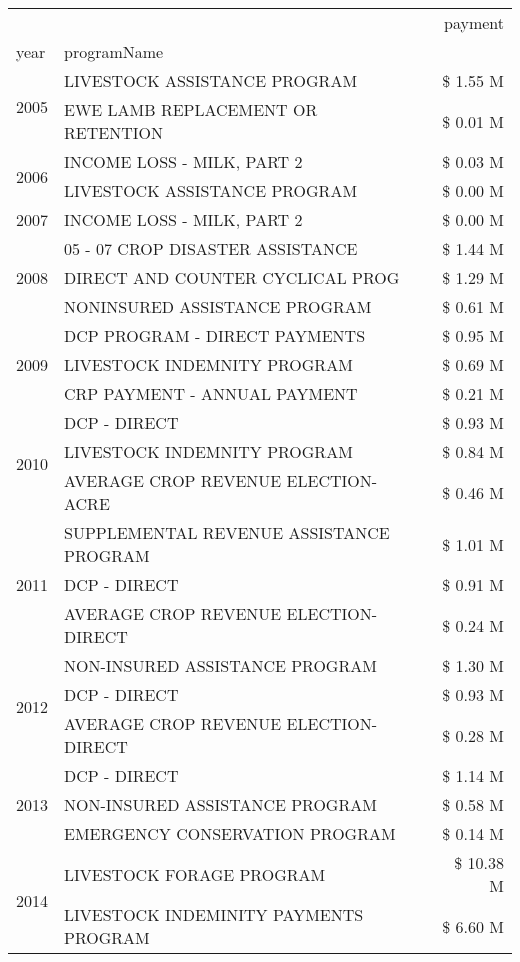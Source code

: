 \begin{tabular}{llr}
\toprule
 &  & payment \\
year & programName &  \\
\midrule
\multirow[t]{2}{*}{2005} & LIVESTOCK ASSISTANCE PROGRAM & \$ 1.55 M \\
 & EWE LAMB REPLACEMENT OR RETENTION & \$ 0.01 M \\
\cline{1-3}
\multirow[t]{2}{*}{2006} & INCOME LOSS - MILK, PART 2 & \$ 0.03 M \\
 & LIVESTOCK ASSISTANCE PROGRAM & \$ 0.00 M \\
\cline{1-3}
2007 & INCOME LOSS - MILK, PART 2 & \$ 0.00 M \\
\cline{1-3}
\multirow[t]{3}{*}{2008} & 05 - 07 CROP DISASTER ASSISTANCE & \$ 1.44 M \\
 & DIRECT AND COUNTER CYCLICAL PROG & \$ 1.29 M \\
 & NONINSURED ASSISTANCE PROGRAM & \$ 0.61 M \\
\cline{1-3}
\multirow[t]{3}{*}{2009} & DCP PROGRAM - DIRECT PAYMENTS & \$ 0.95 M \\
 & LIVESTOCK INDEMNITY PROGRAM & \$ 0.69 M \\
 & CRP PAYMENT - ANNUAL PAYMENT & \$ 0.21 M \\
\cline{1-3}
\multirow[t]{3}{*}{2010} & DCP - DIRECT & \$ 0.93 M \\
 & LIVESTOCK INDEMNITY PROGRAM & \$ 0.84 M \\
 & AVERAGE CROP REVENUE ELECTION-ACRE & \$ 0.46 M \\
\cline{1-3}
\multirow[t]{3}{*}{2011} & SUPPLEMENTAL REVENUE ASSISTANCE PROGRAM & \$ 1.01 M \\
 & DCP - DIRECT & \$ 0.91 M \\
 & AVERAGE CROP REVENUE ELECTION-DIRECT & \$ 0.24 M \\
\cline{1-3}
\multirow[t]{3}{*}{2012} & NON-INSURED ASSISTANCE PROGRAM & \$ 1.30 M \\
 & DCP - DIRECT & \$ 0.93 M \\
 & AVERAGE CROP REVENUE ELECTION-DIRECT & \$ 0.28 M \\
\cline{1-3}
\multirow[t]{3}{*}{2013} & DCP - DIRECT & \$ 1.14 M \\
 & NON-INSURED ASSISTANCE PROGRAM & \$ 0.58 M \\
 & EMERGENCY CONSERVATION PROGRAM & \$ 0.14 M \\
\cline{1-3}
\multirow[t]{3}{*}{2014} & LIVESTOCK FORAGE PROGRAM & \$ 10.38 M \\
 & LIVESTOCK INDEMINITY PAYMENTS PROGRAM & \$ 6.60 M \\

\end{tabular}
